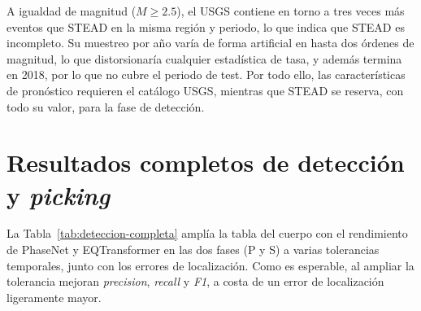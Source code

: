 A igualdad de magnitud (\(M \geq 2.5\)), el USGS contiene en torno a tres veces más eventos que
STEAD en la misma región y periodo, lo que indica que STEAD es incompleto. Su muestreo por año
varía de forma artificial en hasta dos órdenes de magnitud, lo que distorsionaría cualquier
estadística de tasa, y además termina en 2018, por lo que no cubre el periodo de test. Por todo
ello, las características de pronóstico requieren el catálogo USGS, mientras que STEAD se reserva,
con todo su valor, para la fase de detección.

\section{Resultados completos de detección y \textit{picking}}
\label{apendice-deteccion}

La Tabla~\ref{tab:deteccion-completa} amplía la tabla del cuerpo con el rendimiento de PhaseNet y
EQTransformer en las dos fases (P y S) a varias tolerancias temporales, junto con los errores de
localización. Como es esperable, al ampliar la tolerancia mejoran \textit{precision}, \textit{recall}
y \textit{F1}, a costa de un error de localización ligeramente mayor.

